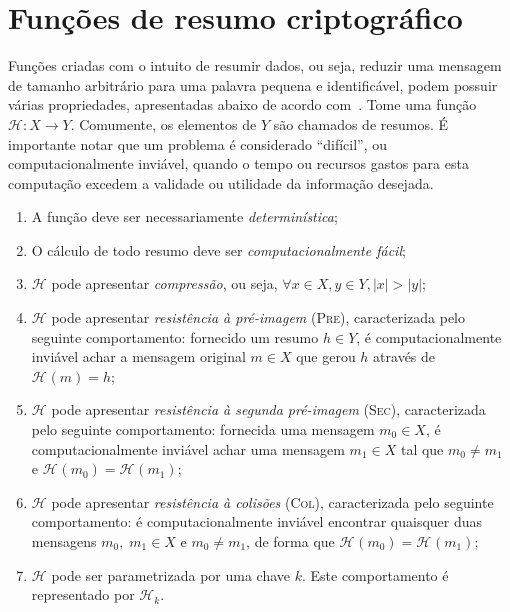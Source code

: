 \documentclass[12pt,notitlepage]{report}
\newcommand{\hh}{\mathcal{H}}
\newcommand{\hash}[2][]{\mathcal{H}^{#1}(#2)}
\newcommand{\length}[1]{\vert #1 \vert}
\begin{document}
\section{Funções de resumo criptográfico}
\label{section:hashfunc}

Funções criadas com o intuito de resumir dados, ou seja, reduzir uma mensagem
de tamanho arbitrário para uma palavra pequena e identificável,
podem possuir várias propriedades, apresentadas abaixo de
acordo com~\cite[9.2]{Menezes:1996:HAC:548089}.  Tome uma função $\mathcal{H} :
X \longrightarrow Y$. Comumente, os elementos de $Y$ são chamados de resumos. É
importante notar que um problema é considerado ``difícil'', ou
computacionalmente inviável, quando o tempo ou recursos gastos para esta
computação excedem a validade ou utilidade da informação desejada.

\begin{enumerate}[label=(\roman*)]

  \item A função deve ser necessariamente \emph{determinística};

  \item O cálculo de todo resumo deve ser \emph{computacionalmente fácil};

  \item $\hh{}$ pode apresentar \emph{compressão}, ou seja, $\forall x \in X, y
      \in Y, \length{x} > \length{y}$;

  \item $\hh{}$ pode apresentar \emph{resistência à pré-imagem} (\textsc{Pre}),
      caracterizada pelo seguinte comportamento: fornecido um resumo $h \in Y$,
        é computacionalmente inviável achar a mensagem original $m \in X$ que
        gerou $h$ através de $\hash{m} = h$;

  \item $\hh{}$ pode apresentar \emph{resistência à segunda pré-imagem}
      (\textsc{Sec}), caracterizada pelo seguinte comportamento: fornecida uma
        mensagem $m_0 \in X$, é computacionalmente inviável achar uma mensagem
        $m_1 \in X$ tal que $m_0 \neq m_1$ e $\hash{m_0} = \hash{m_1}$;

  \item $\hh{}$ pode apresentar \emph{resistência à colisões} (\textsc{Col}),
      caracterizada pelo seguinte comportamento: é computacionalmente inviável
        encontrar quaisquer duas mensagens $m_0, \; m_1 \in X$ e $m_0 \neq
        m_1$, de forma que $\hash{m_0} = \hash{m_1}$;

  \item $\hh{}$ pode ser parametrizada por uma chave $k$. Este comportamento
      é representado por $\hh{}_k$.

\end{enumerate}
\end{document}
